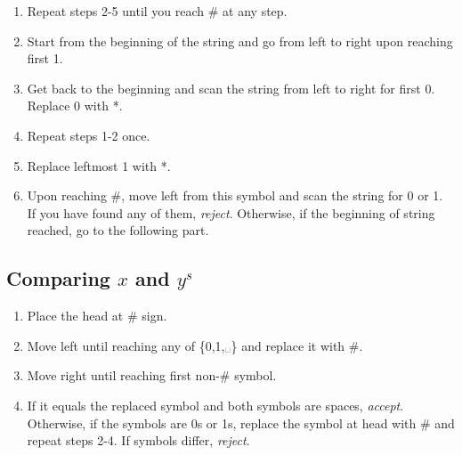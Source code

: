 \documentclass[a4paper, notitlepage]{article}
\begin{document}
\begin{enumerate}

\item Repeat steps 2-5 until you reach \# at any step.

\item Start from the beginning of the string and go from left to right upon reaching first 1.

\item Get back to the beginning and scan the string from left to right for first 0. Replace 0 with *.

\item Repeat steps 1-2 once.

\item Replace leftmost 1 with *.

\item Upon reaching \#, move left from this symbol and scan the string for 0 or 1. If you have found any of them, \emph{reject}. Otherwise, if the beginning of string reached, go to the following part.
\end{enumerate}

\subsection{Comparing $x$ and $y^s$}

\begin{enumerate}

\item Place the head at \# sign.

\item Move left until reaching any of \{0,1,␣\} and replace it with \#.

\item Move right until reaching first non-\# symbol.

\item If it equals the replaced symbol and both symbols are spaces, \emph{accept}. Otherwise, if the symbols are 0s or 1s, replace the symbol at head with \# and repeat steps 2-4. If symbols differ, \emph{reject}.

\end{enumerate}
\end{document}
